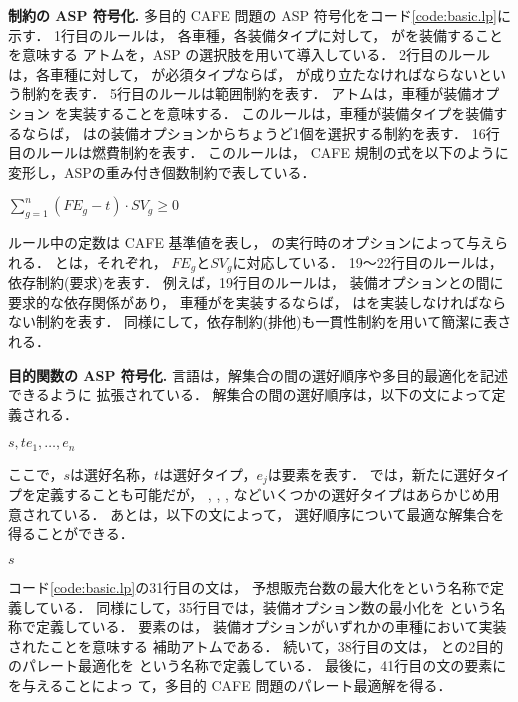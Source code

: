 \textbf{制約の ASP 符号化.}
多目的 CAFE 問題の ASP 符号化をコード\ref{code:basic.lp}に示す．
%
1行目のルールは，
各車種，各装備タイプに対して，
がを装備することを意味する
アトムを，ASP の選択肢を用いて導入している．
%
2行目のルールは，各車種に対して，
が必須タイプならば，
が成り立たなければならないという制約を表す．
%
5行目のルールは範囲制約を表す．
アトムは，車種が装備オプション
を実装することを意味する．
このルールは，車種が装備タイプを装備するならば，
はの装備オプションからちょうど1個を選択する制約を表す．
%
16行目のルールは燃費制約を表す．
このルールは，
CAFE 規制の式を以下のように変形し，ASPの重み付き個数制約で表している．
\begin{center}
\(\sum_{g=1}^{n} (FE_{g}-t)\cdot SV_{g} \geq 0\)  
\end{center}
ルール中の定数は CAFE 基準値を表し，
{\asprin}の実行時のオプションによって与えられる．
とは，それぞれ，
$FE_{g}$と$SV_{g}$に対応している．
%
19〜22行目のルールは，依存制約(要求)を表す．
例えば，19行目のルールは，
装備オプションとの間に要求的な依存関係があり，
車種がを実装するならば，
はを実装しなければならない制約を表す．
同様にして，依存制約(排他)も一貫性制約を用いて簡潔に表される．

\textbf{目的関数の ASP 符号化.}
{\asprin}言語は，解集合の間の選好順序や多目的最適化を記述できるように
拡張されている．
解集合の間の選好順序は，以下の文によって定義される．
\begin{center}
  $s,t$\code{)\{}$e_1,\dots,e_n$
\end{center}
ここで，$s$は選好名称，$t$は選好タイプ，$e_j$は要素を表す．
{\asprin} では，新たに選好タイプを定義することも可能だが，
, 
,
,
などいくつかの選好タイプはあらかじめ用意されている．
あとは，以下の文によって，
選好順序について最適な解集合を得ることができる．
\begin{center}
  $s$
\end{center}

コード\ref{code:basic.lp}の31行目の文は，
予想販売台数の最大化をという名称で定義している．
同様にして，35行目では，装備オプション数の最小化を
という名称で定義している．
要素のは，
装備オプションがいずれかの車種において実装されたことを意味する
補助アトムである．
続いて，38行目の文は，
との2目的のパレート最適化を
という名称で定義している．
最後に，41行目の文の要素にを与えることによっ
て，多目的 CAFE 問題のパレート最適解を得る．

